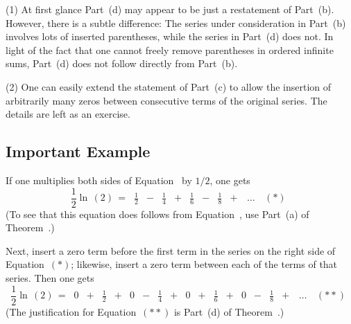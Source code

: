 \V

\hspace*{\parindent}(1) At first glance Part~(d) may appear to be just a restatement of Part~(b).
    However, there is a subtle difference: The series under consideration in Part~(b) involves lots of inserted parentheses,
    while the series in Part~(d) does not. In light of the fact that one cannot freely remove parentheses in ordered infinite sums,
    Part~(d) does not follow directly from Part~(b).

\V

        (2) One can easily extend the statement of Part~(c) to allow the insertion of arbitrarily many zeros between consecutive terms of the original series.
    The details are left as an exercise.

\V
\V

        \subsection{\small{{\bf Important Example}}}
        \label{ExampG30.110}

\V

    If one multiplies both sides of Equation~ by $1/2$, one gets
        \begin{displaymath}
        \frac{1}{2}{\ln}\,(2) \,=\, {\displaystyle 
         \begin{array}{rrrrrrrrrr}
        \frac{1}{2} & - & \frac{1}{4} & + & \frac{1}{6} & - & \frac{1}{8} & + & \,{\ldots}\, & ({\ast})
        \end{array}}
        \end{displaymath}
    (To see that this equation does follows from Equation~, use Part~(a) of Theorem~.)

        Next, insert a zero term before the first term in the series on the right side of Equation~$({\ast})$;
    likewise, insert a zero term between each of the terms of that series. Then one gets
        \begin{displaymath}
        \frac{1}{2}{\ln}\,(2) \,=\,{\displaystyle 
         \begin{array}{rrrrrrrrrrrrrrrrrr}
        0 & + & \frac{1}{2} & + & 0 & - & \frac{1}{4} & + & 0 & + & \frac{1}{6} & + & 0 & - & \frac{1}{8} & + & \,{\ldots}\, & ({\ast}{\ast})
        \end{array}}
        \end{displaymath}
(The justification for Equation~$({\ast}{\ast})$ is Part~(d) of Theorem~.)

